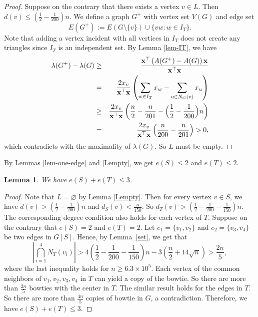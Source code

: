 \documentclass[11pt]{article}
\newtheorem{lemma}[theorem]{Lemma}
\begin{document}
\begin{proof}
Suppose on the contrary that there exists a vertex  $v\in L$. Then $d(v)\le (\frac{1}{2}-\frac{1}{200})n$.
We define a graph $G^+$ with vertex set $V(G)$ and edge set 
\[ E(G^+) := E(G \setminus \{v\}) \cup \{vw: w\in I_T\}. \]  
 Note that adding a vertex incident with all vertices in $I_T$ does not create any triangles 
since $I_T$ is an independent set. 
By Lemma \ref{lem-IT},  we have 
\begin{eqnarray*}
\lambda (G^+) - \lambda (G) &\geq &
 \frac{\mathbf{x}^{\top}\left(A(G^+) - A(G)\right) \mathbf{x}}{\mathbf{x}^{\top} \mathbf{x}} \\ 
 & =& \frac{2 {x}_v}{\mathbf{x}^{\top}\mathbf{x}}\left( \sum_{w\in I_T} {x}_w - \sum_{u\in N_G(v)} {x}_u\right) \\
& \geq & \frac{2 {x}_v}{\mathbf{x}^{\top}\mathbf{x}} 
\left( \frac{n}{2} - \frac{n}{201} - \Bigl(\frac{1}{2}-\frac{1}{200} \Bigr)n \right)\\
&=& \frac{2 {x}_v}{\mathbf{x}^{\top}\mathbf{x}} \left( \frac{n}{200} - \frac{n}{201}\right)> 0,
\end{eqnarray*}
which contradicts 
with the maximality of $\lambda(G)$. 
So $L$ must be empty. 
\end{proof}


By Lemmas \ref{lem-one-edge} and \ref{Lempty},  
we  get $e(S) \le 2$ and $e(T) \le 2$. 

\begin{lemma} \label{STle3}
We have $e(S) + e(T) \le 3$. 
\end{lemma}

\begin{proof}
Note that $L=\varnothing$ by  Lemma \ref{Lempty}. 
Then for every vertex $v\in S$, we have 
$d(v) > (\frac{1}{2} - \frac{1}{200})n $ and 
$d_S(v) < \frac{n}{150}$. So $d_T(v) > (\frac{1}{2} - \frac{1}{200} - \frac{1}{150})n$. The corresponding degree condition also holds for 
each vertex of $T$. Suppose on the contrary 
that $e(S)=2 $ and $ e(T)=2$. 
Let $e_1=\{v_1,v_2\}$ and 
$e_2=\{v_3,v_4\}$ be two edges in $G[S]$. 
Hence, by Lemma~\ref{set}, we get that 
\[  \left| \bigcap_{i=1}^4 N_T(v_i) \right| >  4\left(\frac{1}{2} - \frac{1}{200} - \frac{1}{150} \right)n - 3\left(\frac{n}{2} + 14\sqrt{n} \right) > \frac{2n}{5},\]
where the last inequality holds for $n\ge 6.3\times 10^5$. 
Each vertex of the common neighbors of $v_1,v_2,v_3,v_4$ in $T$ can yield 
a copy of the bowtie. 
So there are more than $\frac{2n}{5}$ bowties 
with the center in $T$. The similar result holds 
for the edges in $T$.  
So there are more than $\frac{4n}{5}$ copies of bowtie in 
$G$, a contradiction. Therefore, we have 
$e(S) + e(T)\le 3$. 
\end{proof}
\end{document}
